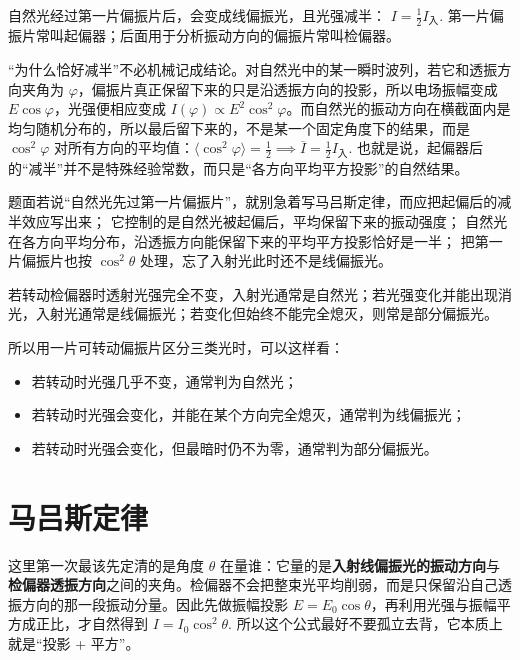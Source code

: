 \documentclass[lang=cn,11pt]{elegantbook}
\newcommand{\bridge}[1]{\begin{note}#1\end{note}}
\begin{document}
自然光经过第一片偏振片后，会变成线偏振光，且光强减半：
 \(I=\frac{1}{2}I_{\text{入}}.\) 
第一片偏振片常叫起偏器；后面用于分析振动方向的偏振片常叫检偏器。

\bridge{“为什么恰好减半”不必机械记成结论。对自然光中的某一瞬时波列，若它和透振方向夹角为 \(\varphi\)，偏振片真正保留下来的只是沿透振方向的投影，所以电场振幅变成 \(E\cos\varphi\)，光强便相应变成 \(I(\varphi)\propto E^2\cos^2\varphi\)。而自然光的振动方向在横截面内是均匀随机分布的，所以最后留下来的，不是某一个固定角度下的结果，而是 \(\cos^2\varphi\) 对所有方向的平均值：\(\langle \cos^2\varphi\rangle=\frac12 \implies \overline I=\frac12 I_{\text{入}}.\) 也就是说，起偏器后的“减半”并不是特殊经验常数，而只是“各方向平均平方投影”的自然结果。}

\begin{note}
 题面若说“自然光先过第一片偏振片”，就别急着写马吕斯定律，而应把起偏后的减半效应写出来； 它控制的是自然光被起偏后，平均保留下来的振动强度； 自然光在各方向平均分布，沿透振方向能保留下来的平均平方投影恰好是一半； 把第一片偏振片也按 \(\cos^2\theta\) 处理，忘了入射光此时还不是线偏振光。
\end{note}

\begin{remark}
若转动检偏器时透射光强完全不变，入射光通常是自然光；若光强变化并能出现消光，入射光通常是线偏振光；若变化但始终不能完全熄灭，则常是部分偏振光。
\end{remark}

\begin{note}
所以用一片可转动偏振片区分三类光时，可以这样看：
\begin{itemize}
 \item 若转动时光强几乎不变，通常判为自然光；
 \item 若转动时光强会变化，并能在某个方向完全熄灭，通常判为线偏振光；
 \item 若转动时光强会变化，但最暗时仍不为零，通常判为部分偏振光。
\end{itemize}
\end{note}

\section{马吕斯定律}

这里第一次最该先定清的是角度 \(\theta\) 在量谁：它量的是\textbf{入射线偏振光的振动方向}与\textbf{检偏器透振方向}之间的夹角。检偏器不会把整束光平均削弱，而是只保留沿自己透振方向的那一段振动分量。因此先做振幅投影 \(E=E_0\cos\theta\)，再利用光强与振幅平方成正比，才自然得到
 \(I=I_0\cos^2\theta.\) 
所以这个公式最好不要孤立去背，它本质上就是“投影 + 平方”。
\end{document}
